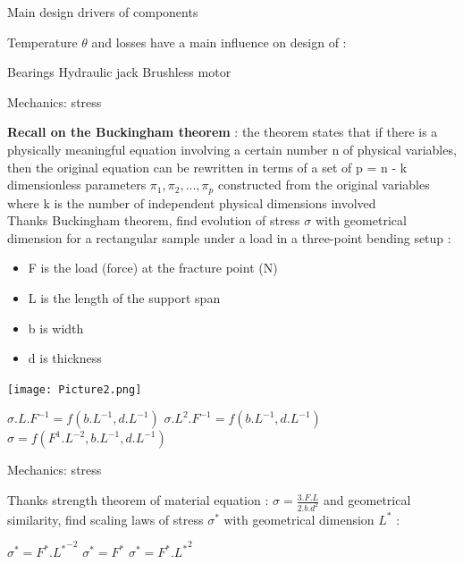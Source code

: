 \documentclass{webquiz}
\begin{document}
    \begin{question} 
    \begin{center}
	\large{Main design drivers of components}
\end{center}
	Temperature $\theta$ and losses have a main influence on design of : \\
     \begin{choice}
      \incorrect  Bearings
      \correct  Hydraulic jack
         \incorrect  Brushless motor
     \end{choice} 
   \end{question}
   
     \begin{question} 
     \begin{center}
	\large{Mechanics: stress}
\end{center}
	\textbf{Recall on the Buckingham theorem} : the theorem states that if there is a physically meaningful equation involving a certain number n of physical variables, then the original equation can be rewritten in terms of a set of p = n - k  dimensionless parameters $\pi_1, \pi_2, ... , \pi_p$ constructed from the original variables where k is the number of independent physical dimensions involved \\
	
	
	Thanks Buckingham theorem, find evolution of stress $\sigma$ with geometrical dimension for a rectangular sample under a load in a three-point bending setup :  
	\begin{minipage}[t]{.8\textwidth}
    \begin{itemize} 
     \item  F is the load (force) at the fracture point (N) 
     \item  L is the length of the support span 
     \item  b is width 
     \item  d is thickness 
     \end{itemize}
      \end{minipage}
\begin{center}
	\texttt{[image: Picture2.png]}
\end{center}
	
     \begin{choice}
      \incorrect  $\sigma.L.F^{-1} = f(b.L^{-1},d.L^{-1})$
      \correct  $\sigma.L^2.F^{-1} = f(b.L^{-1},d.L^{-1})$
         \incorrect  $\sigma = f(F^{1}.L^{-2},b.L^{-1},d.L^{-1})$
     \end{choice} 
   \end{question}
    \begin{question} 
       \begin{center}
	\large{Mechanics: stress}
\end{center}
Thanks strength theorem of material equation : $\sigma = \frac{3.F.L}{2.b.d^2}$ and geometrical similarity, find scaling laws of stress $\sigma^*$ with geometrical dimension $L^*$ : 

     \begin{choice}
      \incorrect $\sigma^* = F^*.{L^*}^{-2}$
      \correct $\sigma^* = F^*$
         \incorrect  $\sigma^* = F^*.{L^*}^2$
     \end{choice} 
   \end{question}
   
\end{document}

